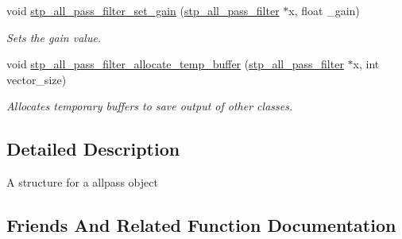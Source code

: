 \begin{DoxyCompactItemize}
\begin{DoxyCompactList}
 \end{DoxyCompactList}\item 
void \hyperlink{structstp__all__pass__filter_ab4e461c65b5eaabdf3256386645ebbc5}{stp\+\_\+all\+\_\+pass\+\_\+filter\+\_\+set\+\_\+gain} (\hyperlink{structstp__all__pass__filter}{stp\+\_\+all\+\_\+pass\+\_\+filter} $\ast$x, float \+\_\+gain)
\begin{DoxyCompactList}\small\item\em Sets the gain value. ~\newline
 \end{DoxyCompactList}\item 
void \hyperlink{structstp__all__pass__filter_ab058db273cfc2f4c6364f739d3be60bf}{stp\+\_\+all\+\_\+pass\+\_\+filter\+\_\+allocate\+\_\+temp\+\_\+buffer} (\hyperlink{structstp__all__pass__filter}{stp\+\_\+all\+\_\+pass\+\_\+filter} $\ast$x, int vector\+\_\+size)
\begin{DoxyCompactList}\small\item\em Allocates temporary buffers to save output of other classes. ~\newline
 \end{DoxyCompactList}\end{DoxyCompactItemize}


\subsection{Detailed Description}
A structure for a allpass object ~\newline
 

\subsection{Friends And Related Function Documentation}
\mbox{\label{structstp__all__pass__filter_ab058db273cfc2f4c6364f739d3be60bf}} 
